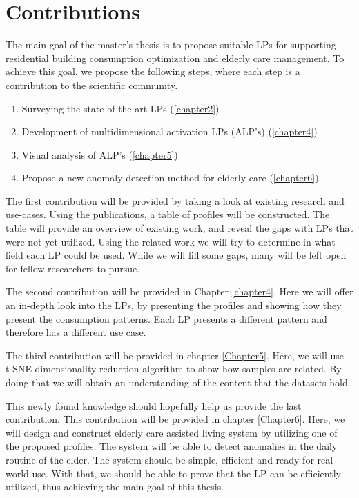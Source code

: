 \section{Contributions}
\label{sec:contributions} %

The main goal of the master's thesis is to propose suitable LPs for supporting residential building consumption optimization and elderly care management.
To achieve this goal, we propose the following steps, where each step is a contribution to the scientific community.

\begin{enumerate}
	\item Surveying the state-of-the-art LPs (\ref{chapter2})
	\item Development of multidimensional activation LPs (ALP's) (\ref{chapter4})
	\item Visual analysis of ALP's (\ref{chapter5})
	\item Propose a new anomaly detection method for elderly care (\ref{chapter6})
\end{enumerate}


The first contribution will be provided by taking a look at existing research and use-cases. 
Using the publications, a table of profiles will be constructed.
The table will provide an overview of existing work, and reveal the gaps with LPs that were not yet utilized.
Using the related work we will try to determine in what field each LP could be used. 
While we will fill some gaps, many will be left open for fellow researchers to pursue.  

The second contribution will be provided in Chapter \ref{chapter4}.
Here we will offer an in-depth look into the LPs, by presenting the profiles and showing how they present the consumption patterns.
Each LP presents a different pattern and therefore has a different use case. 

The third contribution will be provided in chapter \ref{Chapter5}.
Here, we will use t-SNE dimensionality reduction algorithm to show how samples are related.
By doing that we will obtain an understanding of the content that the datasets hold.

This newly found knowledge should hopefully help us provide the last contribution.
This contribution will be provided in chapter \ref{Chapter6}.
Here, we will design and construct elderly care assisted living system by utilizing one of the proposed profiles.
The system will be able to detect anomalies in the daily routine of the elder.
The system should be simple, efficient and ready for real-world use.
With that, we should be able to prove that the LP can be efficiently utilized,
thus achieving the main goal of this thesis.


